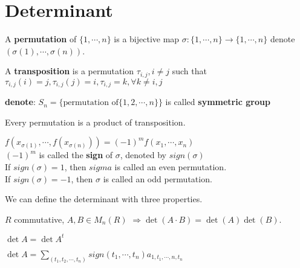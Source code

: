 \section{Determinant}
\begin{definition}
    A \textbf{permutation} of  $ \{1,\cdots,n \} $ is a bijective map  $ \sigma:\{1,\cdots,n\}\rightarrow \{1,\cdots, n \} $ denote  $ (\sigma(1),\cdots,\sigma(n) ) $.
    
    A \textbf{transposition} is a permutation  $ \tau_{i,j },i\not=j  $ such that  $ \tau_{i,j}(i)=j,\tau_{i,j}(j)=i,\tau_{i,j}=k,\forall k\not=i,j  $ 
\end{definition}
\textbf{denote}:  $ S_{n }=\{\text{permutation of} \{1,2,\cdots,n\}\} $  is called \textbf{symmetric group}
\begin{proposition}
    Every permutation is a product of transposition.
\end{proposition}
\begin{definition}
     $ f(x_{\sigma(1)},\cdots,f(x_{\sigma(n)}))=(-1)^mf(x_1,\cdots,x_n) $ \\
      $ (-1)^m  $ is called the \textbf{sign} of  $ \sigma  $, denoted by  $ sign(\sigma) $\\
      If  $ sign(\sigma )=1 $, then  $ sigma  $ is called an even permutation.\\
      If  $ sign(\sigma )=-1 $, then  $ \sigma  $ is called an odd permutation.   
\end{definition}
We can define the determinant with three properties.
\begin{proposition}
     $ R  $ commutative, $ A,B\in M_n(R)   $ $ \Rightarrow \det(A\cdot B)=\det (A)\det(B ) $. 
\end{proposition}
\begin{proposition}
     $ \det A=\det A^t $ 
\end{proposition}
\begin{proposition}
     $ \det A =\sum_{(t_1,t_2,\cdots,t_n )}sign(t_1,\cdots,t_n)a_{1,t_1,\cdots,n,t_n} $ 
\end{proposition}